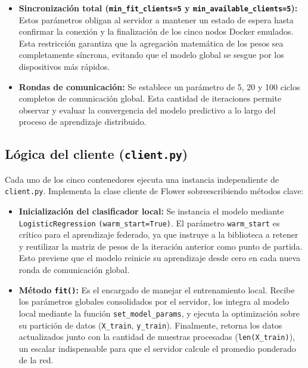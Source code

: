 \documentclass[12pt,a4paper]{article}
\begin{document}
\begin{itemize}
    \item \textbf{Sincronización total (\texttt{min\_fit\_clients=5} y \texttt{min\_available\_clients=5}):} Estos parámetros obligan al servidor a mantener un estado de espera hasta confirmar la conexión y la finalización de los cinco nodos Docker emulados. Esta restricción garantiza que la agregación matemática de los pesos sea completamente síncrona, evitando que el modelo global se sesgue por los dispositivos más rápidos.
    
    \item \textbf{Rondas de comunicación:} Se establece un parámetro de 5, 20 y 100 ciclos completos de comunicación global. Esta cantidad de iteraciones permite observar y evaluar la convergencia del modelo predictivo a lo largo del proceso de aprendizaje distribuido.
\end{itemize}

\subsection{Lógica del cliente (\texttt{client.py})}
Cada uno de los cinco contenedores ejecuta una instancia independiente de \texttt{client.py}. Implementa la clase cliente de Flower sobreescribiendo métodos clave:
\begin{itemize}
    \item \textbf{Inicialización del clasificador local:} Se instancia el modelo mediante \texttt{LogisticRegression} \texttt{(warm\_start=True)}. El parámetro \texttt{warm\_start} es crítico para el aprendizaje federado, ya que instruye a la biblioteca a retener y reutilizar la matriz de pesos de la iteración anterior como punto de partida. Esto previene que el modelo reinicie su aprendizaje desde cero en cada nueva ronda de comunicación global.
    
    \item \textbf{Método \texttt{fit()}:} Es el encargado de manejar el entrenamiento local. Recibe los parámetros globales consolidados por el servidor, los integra al modelo local mediante la función \texttt{set\_model\_params}, y ejecuta la optimización sobre su partición de datos (\texttt{X\_train}, \texttt{y\_train}). Finalmente, retorna los datos actualizados junto con la cantidad de muestras procesadas (\texttt{len(X\_train)}), un escalar indispensable para que el servidor calcule el promedio ponderado de la red.
\end{itemize}
\end{document}

